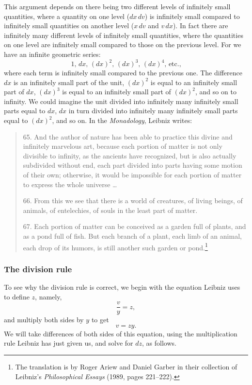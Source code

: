\documentclass[twoside,openright]{article}
\begin{document}
\label{levels} This argument depends on there being two different
levels of infinitely small quantities, where a quantity on one level
($dx\,dv$) is infinitely small compared to infinitely small quantities
on another level ($x\,dv$ and $v\,dx$).  In fact there are infinitely
many different levels of infinitely small quantities, where the
quantities on one level are infinitely small compared to those on the
previous level.  For we have an infinite geometric series:
$$1,\, dx,\, (dx)^2,\, (dx)^3,\, (dx)^4,\, \mbox{etc.,}$$
where each term is infinitely small compared to the previous one.  The
difference $dx$ is an infinitely small part of the unit, $(dx)^2$ is
equal to an infinitely small part of $dx$, $(dx)^3$ is equal to an
infinitely small part of $(dx)^2$, and so on to infinity.  We could
imagine the unit divided into infinitely many infinitely small parts
equal to $dx$, $dx$ in turn divided into infinitely many infinitely
small parts equal to $(dx)^2$, and so on.  In the {\em Monadology},
Leibniz writes:
\begin{quotation}
  65. And the author of nature has been able to practice this divine
  and infinitely marvelous art, because each portion of matter is not
  only divisible to infinity, as the ancients have recognized, but is
  also actually subdivided without end, each part divided into parts
  having some motion of their own; otherwise, it would be impossible
  for each portion of matter to express the whole universe \ldots

  66. From this we see that there is a world of creatures, of living
  beings, of animals, of entelechies, of souls in the least part of
  matter.

  67. Each portion of matter can be conceived as a garden full of
  plants, and as a pond full of fish.  But each branch of a plant,
  each limb of an animal, each drop of its humors, is still another
  such garden or pond.\footnote{The translation is by Roger Ariew and
    Daniel Garber in their collection of Leibniz's {\em Philosophical
      Essays} (1989, pages 221--222).}
\end{quotation}

\subsubsection*{The division rule}


To see why the division rule is correct, we begin with the equation
Leibniz uses to define $z$, namely,
$$\frac{v}{y} = z ,$$
and multiply both sides by $y$ to get
$$v= zy.$$
We will take differences of both sides of this equation, using the
multiplication rule Leibniz has just given us, and solve for $dz$, as
follows.
\end{document}
